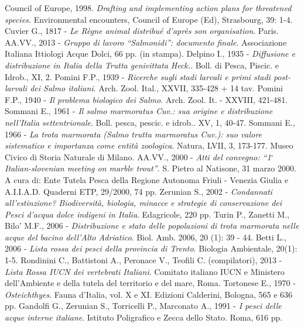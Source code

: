 \documentclass[10pt,twoside,openany,x11names,svgnames,italian,a5paper,dvipsnames,table]{memoir}
\begin{document}
\begin{thebibliography}{9}
\footnotesize
{} Council of Europe, 1998. \emph{Drafting and implementing action plans for threatened species.} Environmental encounters, Council of Europe (Ed), Strasbourg, 39: 1-4.
 Cuvier G., 1817 - \emph{Le Règne animal distribué d’après son organisation}. Paris.
 AA.VV., 2013 - \emph{Gruppo di lavoro “Salmonidi”: documento finale}. Associazione Italiana Ittiologi Acque Dolci, 66 pp. (in stampa).
 Delpino I., 1935 - \emph{Diffusione e distribuzione in Italia della Trutta genivittata Heck.}. Boll. di Pesca, Piscic. e Idrob., XI, 2.
 Pomini F.P., 1939 - \emph{Ricerche sugli stadi larvali e primi stadi post-larvali dei Salmo italiani}. Arch. Zool. Ital., XXVII, 335-428 + 14 tav.
 Pomini F.P., 1940 - \emph{Il problema biologico dei Salmo}. Arch. Zool. It. - XXVIII, 421-481.
 Sommani E., 1961 - \emph{Il salmo marmoratus Cuv.: sua origine e distribuzione nell’Italia settentrionale}. Boll. pesca, pescic. e idrob.. XV, 1, 40-47.
 Sommani E., 1966 - \emph{La trota marmorata (Salmo trutta marmoratus Cuv.): suo valore sistematico e importanza come entità zoologica}. Natura, LVII, 3, 173-177. Museo Civico di Storia Naturale di Milano.
 AA.VV., 2000 - \emph{Atti del convegno: “1$^\circ$ Italian-slovenian meeting on marble trout”}. S. Pietro al Natisone, 31 marzo 2000. A cura di: Ente Tutela Pesca della Regione Autonoma Friuli - Venezia Giulia e A.I.I.A.D. Quaderni ETP, 29/2000, 74 pp.
 Zerunian S., 2002 - \emph{Condannati all’estinzione? Biodiversità, biologia, minacce e strategie di conservazione dei Pesci d’acqua dolce indigeni in Italia}. Edagricole, 220 pp.
 Turin P., Zanetti M., Bilo’ M.F., 2006 - \emph{Distribuzione e stato delle popolazioni di trota marmorata nelle acque del bacino dell’Alto Adriatico}. Biol. Amb. 2006, 20 (1): 39 - 44.
 Betti L., 2006 - \emph{Lista rossa dei pesci della provincia di Trento}. Biologia Ambientale, 20(1): 1-5.
 Rondinini C., Battistoni A., Peronace V., Teofili C. (compilatori), 2013 - \emph{Lista Rossa IUCN dei vertebrati Italiani}. Comitato italiano IUCN e Ministero dell’Ambiente e della tutela del territorio e del mare, Roma.
 Tortonese E., 1970 - \emph{Osteichthyes}. Fauna d'Italia, vol. X e XI. Edizioni Calderini, Bologna, 565 e 636 pp.
 Gandolfi G., Zerunian S., Torricelli P., Marconato A., 1991 - \emph{I pesci delle acque interne italiane}. Istituto Poligrafico e Zecca dello Stato. Roma, 616 pp.

\end{thebibliography}
\end{document}
